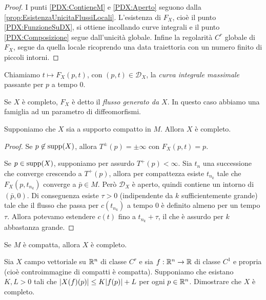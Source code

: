 \begin{proof}
	I punti \ref{PDX:ContieneM} e \ref{PDX:Aperto} seguono dalla \cref{prop:EsistenzaUnicitaFlussiLocali}. L'esistenza di $F_X$, cioè il punto \ref{PDX:FunzioneSuDX}, si ottiene incollando curve integrali e il punto \ref{PDX:Composizione} segue dall'unicità globale.
	Infine la regolarità $C^r$ globale di $F_X$, segue da quella locale ricoprendo una data traiettoria con un numero finito di piccoli intorni.
\end{proof}

\begin{definition}  
	Chiamiamo $t\mapsto F_X(p,t)$, con $(p,t)\in\mathscr D_X$, la \emph{curva integrale massimale} passante per $p$ a tempo 0.
	
	Se $X$ è completo, $F_X$ è detto il \emph{flusso generato da $X$}. In questo caso abbiamo una famiglia ad un parametro di diffeomorfismi.
\end{definition}

\begin{proposition}
	Supponiamo che $X$ sia a supporto compatto in $M$. Allora $X$ è completo.
\end{proposition}

\begin{proof}
	Se $p\not \in\operatorname{supp} (X)$, allora $T^{\pm}(p)=\pm\infty$ con $F_X(p,t)=p$.
	
	Se $p\in\operatorname{supp}(X)$, supponiamo per assurdo $T^+(p)<\infty$. Sia $t_n$ una successione che converge crescendo a $T^+(p)$, allora per compattezza esiste $t_{n_k}$ tale che $F_X(p,t_{n_k})$ converge a $\bar p\in M$.
	Però $\mathscr D_X$ è aperto, quindi contiene un intorno di $(\bar p,0)$.
	Di conseguenza esiste $\tau >0$ (indipendente da $k$ sufficientemente grande) tale che il flusso che passa per $c(t_{n_k})$ a tempo 0 è definito almeno per un tempo $\tau$.
	Allora potevamo estendere $c(t)$ fino a $t_{n_k}+\tau$, il che è assurdo per $k$ abbastanza grande.
\end{proof}


\begin{corollary}
	Se $M$ è compatta, allora $X$ è completo.
\end{corollary}


\begin{exercise}
	Sia $X$ campo vettoriale su $\mathbb R^n$ di classe $C^r$ e sia $f:\mathbb R^n\to \mathbb R$ di classe $C^1$ e propria (cioè controimmagine di compatti è compatta). Supponiamo che esistano $K,L>0$ tali che $\lvert X(f)(p)\rvert\le K\lvert f(p)\rvert+L$ per ogni $p\in\mathbb R^n$. %
	Dimostrare che $X$ è completo. %
\end{exercise}
